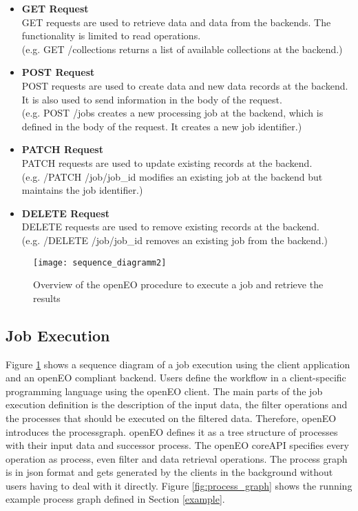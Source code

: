 \documentclass[draft,final]{vutinfth} %
\newcommand{\bgoessweindel}[1]{{\color{red}#1}}
\begin{document}
\begin{itemize}
	\item \textbf{GET Request} \\
	GET requests are used to retrieve data \bgoessweindel{and data} from the backends. The functionality is limited to read operations. \\(e.g. GET /collections returns a list of available collections at the backend.)
	\item \textbf{POST Request} \\ 
	POST requests are used to create \bgoessweindel{data and} new data records at the backend. It is also used to send information in the body of the request. \\(e.g. POST /jobs creates a new processing job at the backend, which is defined in the body of the request. It creates a new job identifier.)  
	\item \textbf{PATCH Request} \\
	PATCH requests are used to update existing records at the backend. \\(e.g. /PATCH /job/{job\_id} modifies an existing job at the backend but maintains the job identifier.)
	\item \textbf{DELETE Request} \\ 
	DELETE requests are used to remove existing records at the backend. \\(e.g. /DELETE /job/{job\_id} removes an existing job from the backend.)
\end{itemize}
\begin{figure}[h]
	\centering
	\texttt{[image: sequence\_diagramm2]}
	\caption{Overview of the openEO procedure to execute a job and retrieve the results}
	\label{fig:api2} %
\end{figure}


\subsection{Job Execution}\label{Job Execution}
Figure \ref{fig:api2} shows a sequence diagram of a job execution using the client application and an openEO compliant backend. Users define the workflow in a client-specific programming language using the openEO client. The main parts of the job execution definition is the description of the input data, the filter operations and the processes that should be executed on the filtered data. Therefore, openEO introduces the \gls{processgraph}. openEO defines it as a tree structure of processes with their input data and successor process. The openEO coreAPI specifies every operation as process, even filter and data retrieval operations. The process graph is in \gls{json} format and gets generated by the clients in the background without users having to deal with it directly. Figure \ref{fig:process_graph} shows the running example process graph defined in Section \ref{example}.  
\end{document}
